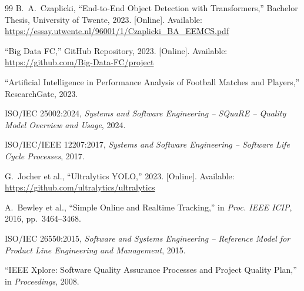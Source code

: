 \documentclass[10pt,twocolumn,a4paper]{article}
\begin{document}
\begin{thebibliography}{99}
B.~A.~Czaplicki, ``End-to-End Object Detection with Transformers,'' Bachelor Thesis, University of Twente, 2023. [Online]. Available: \url{https://essay.utwente.nl/96001/1/Czaplicki_BA_EEMCS.pdf}

``Big Data FC,'' GitHub Repository, 2023. [Online]. Available: \url{https://github.com/Big-Data-FC/project}

``Artificial Intelligence in Performance Analysis of Football Matches and Players,'' ResearchGate, 2023.

ISO/IEC 25002:2024, \textit{Systems and Software Engineering -- SQuaRE -- Quality Model Overview and Usage}, 2024.

ISO/IEC/IEEE 12207:2017, \textit{Systems and Software Engineering -- Software Life Cycle Processes}, 2017.

G.~Jocher et al., ``Ultralytics YOLO,'' 2023. [Online]. Available: \url{https://github.com/ultralytics/ultralytics}

A.~Bewley et al., ``Simple Online and Realtime Tracking,'' in \textit{Proc. IEEE ICIP}, 2016, pp.~3464--3468.

ISO/IEC 26550:2015, \textit{Software and Systems Engineering -- Reference Model for Product Line Engineering and Management}, 2015.

``IEEE Xplore: Software Quality Assurance Processes and Project Quality Plan,'' in \textit{Proceedings}, 2008.

\end{thebibliography}

\balance
\end{document}

